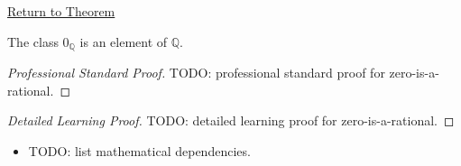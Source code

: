 \newpage
{}
\label{prf:zero-is-a-rational}

\begin{remark*}[Return]
\hyperref[thm:zero-is-a-rational]{Return to Theorem}
\end{remark*}

\begin{theorem*}
The class $0_{\mathbb{Q}}$ is an element of $\mathbb{Q}$.
\end{theorem*}

\begin{proof}[Professional Standard Proof]
\LRAProofBodyStart
TODO: professional standard proof for zero-is-a-rational.
\end{proof}

\begin{proof}[Detailed Learning Proof]
\LRAProofBodyStart
TODO: detailed learning proof for zero-is-a-rational.
\end{proof}

\begin{remark*}
\end{remark*}

\begin{dependencies}
\begin{itemize}
  \item TODO: list mathematical dependencies.
\end{itemize}
\end{dependencies}

\clearpage
